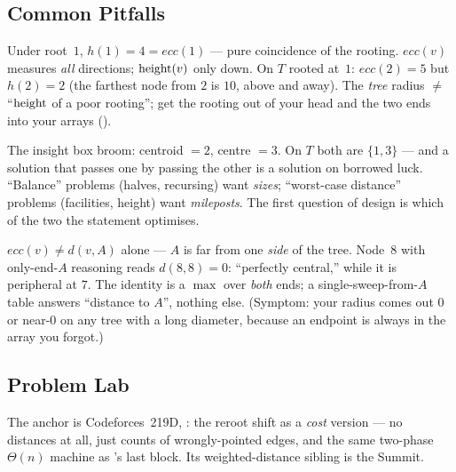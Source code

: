 \subsection{Common Pitfalls}

\begin{warningbox}
Under root~$1$, $h(1) = 4 = \mathit{ecc}(1)$ --- pure coincidence of the rooting.
$\mathit{ecc}(v)$ measures \emph{all} directions; $\operatorname{height}(v)$ only down. On $T$ rooted
at~$1$: $\mathit{ecc}(2) = 5$ but $h(2) = 2$ (the farthest node from $2$ is $10$, above
and away). The \emph{tree} radius $\ne$ ``$\operatorname{height}$ of a poor rooting''; get the rooting
out of your head and the two ends into your arrays ().
\end{warningbox}

\begin{warningbox}
The insight box broom: centroid $=2$, centre $=3$. On $T$ both are $\{1,3\}$ --- and a
solution that passes one by passing the other is a solution on borrowed luck.
``Balance'' problems (halves, recursing) want \emph{sizes}; ``worst-case distance''
problems (facilities, height) want \emph{mileposts}. The first question of design is
which of the two the statement optimises.
\end{warningbox}

\begin{warningbox}
$\mathit{ecc}(v) \ne d(v, A)$ alone --- $A$ is far from one \emph{side} of the tree.
Node~$8$ with only-end-$A$ reasoning reads $d(8,8) = 0$: ``perfectly central,'' while
it is peripheral at $7$. The identity is a $\max$ over \emph{both} ends; a
single-sweep-from-$A$ table answers ``distance to $A$'', nothing else. (Symptom: your
radius comes out $0$ or near-$0$ on any tree with a long diameter, because an endpoint
is always in the array you forgot.)
\end{warningbox}

\subsection{Problem Lab}

The anchor is Codeforces~219D, : the reroot shift as a
\emph{cost} version --- no distances at all, just counts of wrongly-pointed edges, and
the same two-phase $\Theta(n)$ machine as 's last block. Its
weighted-distance sibling is the Summit.

